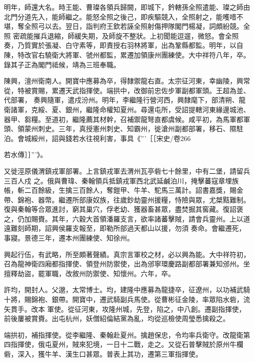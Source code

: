 \begin{pinyinscope}
 明年，師還大名。時王能、曹璨各領兵歸闕，即城下，鈐轄孫全照遣能、璨之師由北門分道先入，能師繼之。能怒全照之後己，即疾驅競入，全照射之，能嚄唶不堪，奪全照弓以去。翌日，詣判府王欽若誣全照射傷押隊閣門楊凝，詞頗紛競。全照
 密疏能摧兵退縮，師緩失期，及師旋不整狀。上初聞能逗遛，微怒。會全照奏，乃質實於張凝、白守素等，即責授右羽林將軍，出為鞏縣都監。明年，以自陳，特改官右驍衛大將軍、虢州都監，累遷加領康州團練使。大中祥符八年，卒。錄其子正為閣門祗候，靖為三班奉職。



 陳興，澶州衛南人。開寶中應募為卒，得隸禦龍右直。太宗征河東，幸幽陵，興常從，特被賞賜，累遷天武指揮使。端拱中，改御前忠佐步軍副都軍頭。王超為並、代部署，
 奏興隨軍，遣戍汾州。明年，李繼隆行營河西，興隸麾下，部清朔、龍衛諸軍，克綏、夏、銀州，繼隆命權知夏州。尋還屯所，受詔提轄河東緣邊城池、器甲、芻糧。至道初，繼隆薦其材幹，召補禦龍弩直都虞候。咸平初，為馬軍都軍頭、領蒙州刺史。三年，真授憲州刺史、知霸州，徙滄州副都部署，移石、隰駐泊。會城綏州，詔與錢若水往視利害，事具《'''［［宋史/卷266
 
 若水傳］］'''》。



 又徙涇原儀渭鎮戎軍部署。上言鎮戎軍去渭州瓦亭砦七十餘里，中有二堡，請留兵三百人戍
 之。俄與曹瑋、秦翰領兵抵鎮戎軍西北武延鹹泊川，掩擊蕃寇章埋族帳，斬二百餘級，生擒三百餘人，奪鎧甲、牛羊、駝馬三萬計。詔書嘉獎，賜金帶、錦袍、器幣。繼遷所部康奴族，往歲鈔劫靈州援糧，恃險與眾，尤桀黠難制。復與秦翰等合眾進討，窮其巢穴，俘老幼、獲器畜甚眾，盡焚掘其窖藏。復詔褒之，仍加賜賚。其年，六穀大首領潘羅支言，欲率諸蕃擊賊，請會兵靈州。上以道遠難刻師期，詔興侯羅支報至，即勒所部過天都山以援，勿須
 奏命。會繼遷死，事寢。景德三年，遷本州團練使、知徐州。



 興起行伍，有武略，所至頗著聲績。真宗言軍校之材，必以興為能。大中祥符初，召為龍神衛四廂都指揮使、領登州防禦使，出為邠寧環慶路副都部署兼知邠州。坐擅釋劫盜，罷軍職，改敘州防禦使、知懷州。六年，卒。



 許均，開封人。父邈，太常博士。均，建隆中應募為龍捷卒，征遼州，以功補武騎十將，賜錦袍、銀帶。開寶中，遷武騎副兵馬使。從曹彬征金陵，率眾陷水砦，流矢貫手。改本
 軍使。從征河東，攻隆州城，先登，陷之，中八創。遷副指揮使，前後屢被賞賚。出屯杭州，妖僧紹倫結黨為亂，均從巡檢使周瑩悉擒殺之。



 端拱初，補指揮使。從李繼隆、秦翰赴夏州。擒趙保忠，令均率兵衛守。改龍衛第四指揮使，俄屯夏州，賊來犯境，一日十二戰，走之。又從石普擊賊於原州牛欄砦，深入，獲牛羊、漢生口甚眾。普表上其功，遷第三軍指揮使。




\end{pinyinscope}
